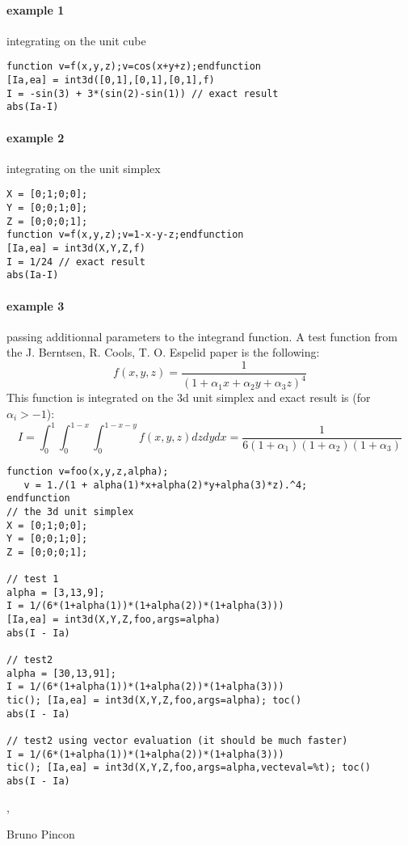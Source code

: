 \begin{examples}
  
\paragraph{example 1} integrating on the unit cube 
\begin{Verbatim}
function v=f(x,y,z);v=cos(x+y+z);endfunction
[Ia,ea] = int3d([0,1],[0,1],[0,1],f)
I = -sin(3) + 3*(sin(2)-sin(1)) // exact result  
abs(Ia-I)
\end{Verbatim}
  
\paragraph{example 2} integrating on the unit simplex
\begin{Verbatim}
X = [0;1;0;0];
Y = [0;0;1;0];
Z = [0;0;0;1];
function v=f(x,y,z);v=1-x-y-z;endfunction
[Ia,ea] = int3d(X,Y,Z,f)
I = 1/24 // exact result  
abs(Ia-I)
\end{Verbatim}
  
\paragraph{example 3} passing additionnal parameters to the integrand function.
A test function from the J. Berntsen, R. Cools, T. O. Espelid paper is the
following:
$$
 f(x,y,z) = \frac{1}{(1 + \alpha_1 x +  \alpha_2 y +  \alpha_3 z)^4 } 
$$
This function is integrated on the 3d unit simplex and exact result is (for $\alpha_i > -1$):
$$
I = \int_0^1 \int_0^{1-x} \int_0^{1-x-y} f(x,y,z) dz dy dx = \frac{1}{6 (1+\alpha_1)(1+\alpha_2)(1+\alpha_3)}
$$
\begin{Verbatim}
function v=foo(x,y,z,alpha);
   v = 1./(1 + alpha(1)*x+alpha(2)*y+alpha(3)*z).^4;
endfunction
// the 3d unit simplex
X = [0;1;0;0];
Y = [0;0;1;0];
Z = [0;0;0;1];

// test 1
alpha = [3,13,9];
I = 1/(6*(1+alpha(1))*(1+alpha(2))*(1+alpha(3)))
[Ia,ea] = int3d(X,Y,Z,foo,args=alpha)
abs(I - Ia)

// test2
alpha = [30,13,91];
I = 1/(6*(1+alpha(1))*(1+alpha(2))*(1+alpha(3)))
tic(); [Ia,ea] = int3d(X,Y,Z,foo,args=alpha); toc()
abs(I - Ia)

// test2 using vector evaluation (it should be much faster)
I = 1/(6*(1+alpha(1))*(1+alpha(2))*(1+alpha(3)))
tic(); [Ia,ea] = int3d(X,Y,Z,foo,args=alpha,vecteval=%t); toc()
abs(I - Ia)

\end{Verbatim}

\end{examples}

\begin{manseealso}
   ,    
\end{manseealso}

\begin{authors}
  Bruno Pincon
\end{authors}
